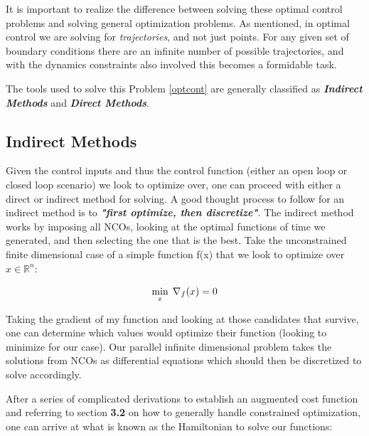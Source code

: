﻿\documentclass[twoside]{article}
\begin{document}
It is important to realize the difference between solving these optimal control problems and solving general optimization problems. As mentioned, in optimal control we are solving for \textit{trajectories}, and not just points. For any given set of boundary conditions there are an infinite number of possible trajectories, and with the dynamics constraints also involved this becomes a formidable task.

The tools used to solve this Problem \ref{optcont} are generally classified as \textit{\textbf{Indirect Methods}} and \textit{\textbf{Direct Methods}}.




\subsection{Indirect Methods}

Given the control inputs and thus the control function (either an open loop or closed loop scenario) we look to optimize over, one can proceed with either a direct or indirect method for solving. A good thought process to follow for an indirect method is to \textit{\textbf{"first optimize, then discretize"}}. The indirect method works by imposing all NCOs, looking at the optimal functions of time we generated, and then selecting the one that is the best. Take the unconstrained finite dimensional case of a simple function f(x) that we look to optimize over $x \in \mathbb{R}^n$:

$$\underset{x}{\text{min}} \:\: \nabla_f(x) = 0 \\$$

Taking the gradient of my function and looking at those candidates that survive, one can determine which values would optimize their function (looking to minimize for our case). Our parallel infinite dimensional problem takes the solutions from NCOs as differential equations which should then be discretized to solve accordingly.

After a series of complicated derivations to establish an augmented cost function and referring to section \textbf{3.2} on how to generally handle constrained optimization, one can arrive at what is known as the Hamiltonian to solve our functions:
\end{document}
